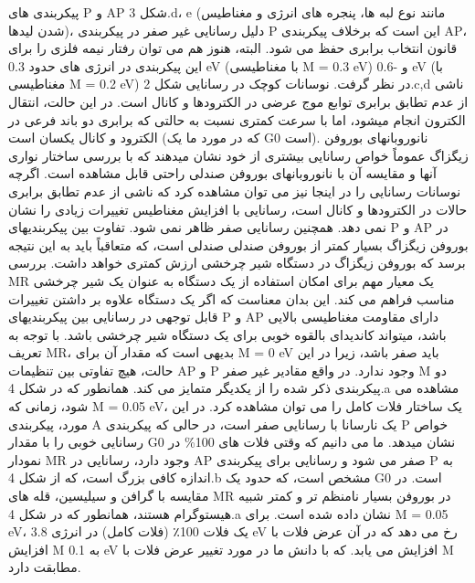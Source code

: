 پیکربندی های P و AP شکل 3.d، e (مانند نوع لبه ها، پنجره های انرژی و مغناطیس شدن لیدها)، دلیل رسانایی غیر صفر در پیکربندی P این است که برخلاف پیکربندی AP، قانون انتخاب برابری حفظ می شود. البته، هنوز هم می توان رفتار نیمه فلزی را برای این پیکربندی در انرژی های حدود 0.3 eV (با مغناطیسی M = 0.3 eV) و -0.6 eV (با مغناطیسی M = 0.2 eV) در نظر گرفت. نوسانات کوچک در رسانایی شکل 2.c,d ناشی از عدم تطابق برابری توابع موج عرضی در الکترودها و کانال است. در این حالت، انتقال الکترون انجام میشود، اما با سرعت کمتری نسبت به حالتی که برابری دو باند فرعی در الکترود و کانال یکسان است (که در مورد ما یک G0 است). نانوروبانهای بوروفن زیگزاگ عموماً خواص رسانایی بیشتری از خود نشان میدهند که با بررسی ساختار نواری آنها و مقایسه آن با نانوروبانهای بوروفن صندلی راحتی قابل مشاهده است. اگرچه نوسانات رسانایی را در اینجا نیز می توان مشاهده کرد که ناشی از عدم تطابق برابری حالات در الکترودها و کانال است، رسانایی با افزایش مغناطیس تغییرات زیادی را نشان نمی دهد. همچنین رسانایی صفر ظاهر نمی شود. تفاوت بین پیکربندیهای P و AP در بوروفن زیگزاگ بسیار کمتر از بوروفن صندلی صندلی است، که متعاقباً باید به این نتیجه برسد که بوروفن زیگزاگ در دستگاه شیر چرخشی ارزش کمتری خواهد داشت. بررسی MR یک معیار مهم برای امکان استفاده از یک دستگاه به عنوان یک شیر چرخشی مناسب فراهم می کند. این بدان معناست که اگر یک دستگاه علاوه بر داشتن تغییرات قابل توجهی در رسانایی بین پیکربندیهای P و AP دارای مقاومت مغناطیسی بالایی باشد، میتواند کاندیدای بالقوه خوبی برای یک دستگاه شیر چرخشی باشد. با توجه به تعریف MR، بدیهی است که مقدار آن برای M = 0 eV باید صفر باشد، زیرا در این حالت، هیچ تفاوتی بین تنظیمات AP و P وجود ندارد. در واقع مقادیر غیر صفر M دو پیکربندی ذکر شده را از یکدیگر متمایز می کند. همانطور که در شکل 4.a مشاهده می شود، زمانی که M = 0.05 eV، یک ساختار فلات کامل را می توان مشاهده کرد. در این مورد، پیکربندی A یک نارسانا با رسانایی صفر است، در حالی که پیکربندی P خواص رسانایی خوبی را با مقدار G0 نشان میدهد. ما می دانیم که وقتی فلات های 100\% در نمودار MR وجود دارد، رسانایی در AP صفر می شود و رسانایی برای پیکربندی P به اندازه کافی بزرگ است، که از شکل 4.b مشخص است، که حدود یک G0 است. در مقایسه با گرافن و سیلیسین، قله های MR در بوروفن بسیار نامنظم تر و کمتر شبیه هیستوگرام هستند، همانطور که در شکل 4.a نشان داده شده است. برای M = 0.05 eV، یک فلات 100٪ (فلات کامل) در انرژی 3.8 eV رخ می دهد که در آن عرض فلات با افزایش M به 0.1 eV افزایش می یابد. که با دانش ما در مورد تغییر عرض فلات با M مطابقت دارد.
